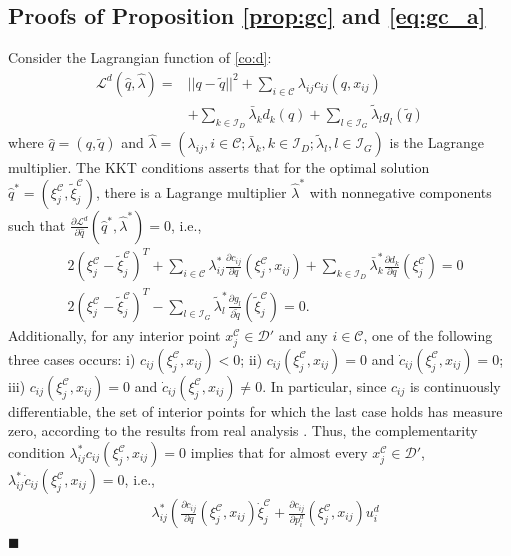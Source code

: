 \documentclass[journal]{IEEEtran}
\newenvironment{Proof}{\noindent{\em Proof:\/}}{\hfill $\blacksquare$\par}
\newcommand{\D}{\mathcal{D}}
\newcommand{\I}{\mathcal{I}}
\newcommand{\C}{\mathcal{C}}
\newcommand{\1}{\mathbf{1}}
\renewcommand{\L}{\mathcal{L}}
\begin{document}
\subsection{Proofs of Proposition \ref{prop:gc} and \eqref{eq:gc_a}}\label{proof:gc}

\begin{Proof}
Consider the Lagrangian function of \eqref{co:d}:
\begin{equation*}
	\begin{split}
		\L^d(\hat{q},\hat{\lambda})=&||q-\tilde{q}||^2+\sum_{i\in \C}\lambda_{ij} c_{ij}(q,x_{ij})\\
		&+\sum_{k\in\I_D}\bar{\lambda}_{k}d_k(q)+\sum_{l\in\I_G}\tilde{\lambda}_{l}g_l(\tilde{q})
	\end{split}
\end{equation*}
where $\hat{q}=(q,\tilde{q})$ and $\hat{\lambda}=(\lambda_{ij},i\in \C;\bar{\lambda}_k,k\in \I_D;\tilde{\lambda}_l,l\in\I_G)$ is the Lagrange multiplier. The KKT conditions asserts that for the optimal solution $\hat{q}^*=(\xi^\C_j,\tilde{\xi}^\C_j)$, there is a Lagrange multiplier $\hat{\lambda}^*$ with nonnegative components such that $\frac{\partial\L^d}{\partial \hat{q}}(\hat{q}^*,\hat{\lambda}^*)=0$, i.e., 
\begin{align}
	&2(\xi^\C_j-\tilde{\xi}^\C_j)^T+\sum_{i\in \C}\lambda_{ij}^*\frac{\partial c_{ij}}{\partial q}(\xi^\C_j,x_{ij})+\sum_{k\in\I_D}\bar{\lambda}_k^*\frac{\partial d_k}{\partial q}(\xi^\C_j)=0\label{eq:d1}\\
	&2(\xi^\C_j-\tilde{\xi}^\C_j)^T-\sum_{l\in\I_G}\tilde{\lambda}_{l}^*\frac{\partial g_l}{\partial \tilde{q}}(\tilde{\xi}^\C_j)=0.\label{eq:d2}
\end{align}
Additionally, for any interior point $x^\C_j\in \D'$ and any $i\in \C$, one of the following three cases occurs: 
i) $c_{ij}(\xi^\C_j,x_{ij})<0$; ii) $c_{ij}(\xi^\C_j,x_{ij})=0$ and $\dot{c}_{ij}(\xi^\C_j,x_{ij})=0$; iii) $c_{ij}(\xi^\C_j,x_{ij})=0$ and $\dot{c}_{ij}(\xi^\C_j,x_{ij})\neq 0$. In particular, since $c_{ij}$ is continuously differentiable, 
the set of interior points for which the last case holds has measure zero, according to the results from real analysis \cite{royden1988real}. Thus, the complementarity condition $\lambda_{ij}^*c_{ij}(\xi^\C_j,x_{ij})=0$ implies that for almost every $x^\C_j\in \D'$, $\lambda_{ij}^*\dot{c}_{ij}(\xi^\C_j,x_{ij})=0$, i.e., 
\begin{equation}\label{eq:d3}
	\begin{split}
		&\lambda_{ij}^*\left(\frac{\partial c_{ij}}{\partial q}(\xi^\C_j,x_{ij})\dot{\xi}^\C_j+\frac{\partial c_{ij}}{\partial p^d_i}(\xi^\C_j,x_{ij})u^d_i\right.\\

\end{split}
\end{equation}
\end{Proof}
\end{document}
